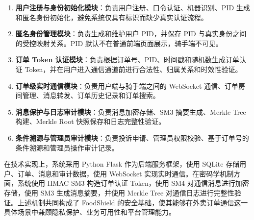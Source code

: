 \begin{enumerate}[label=\arabic*., leftmargin=2em]
\item \textbf{用户注册与身份初始化模块}：负责用户注册、口令认证、机器识别、PID 生成和匿名身份初始化，避免系统仅具有标识而缺少真实认证流程。
\item \textbf{匿名身份管理模块}：负责生成和维护用户 PID，并保存 PID 与真实身份之间的受控映射关系。PID 默认不在普通前端页面展示，骑手端不可见。
\item \textbf{订单 Token 认证模块}：负责根据订单号、PID、时间戳和随机数生成订单认证 Token，并在用户进入通信通道前进行合法性、归属关系和时效性验证。
\item \textbf{订单级实时通信模块}：负责用户端与骑手端之间的 WebSocket 通信、订单房间管理、消息转发、订单历史记录和订单搜索。
\item \textbf{消息保护与日志审计模块}：负责消息加密存储、SM3 摘要生成、Merkle Tree 构建、Merkle Root 快照保存和日志完整性验证。
\item \textbf{条件溯源与管理员审计模块}：负责投诉申请、管理员权限校验、基于订单号的条件溯源和管理员操作审计记录。
\end{enumerate}

在技术实现上，系统采用 Python Flask 作为后端服务框架，使用 SQLite 存储用户、订单、消息和审计数据，使用 WebSocket 实现实时通信。在密码学机制方面，系统使用 HMAC-SM3 构造订单认证 Token，使用 SM4 对通信消息进行加密存储，使用 SM3 生成消息摘要，并使用 Merkle Tree 对通信日志进行完整性验证。上述机制共同构成了 FoodShield 的安全基础，使其能够在外卖订单通信这一具体场景中兼顾隐私保护、业务可用性和平台管理能力。
